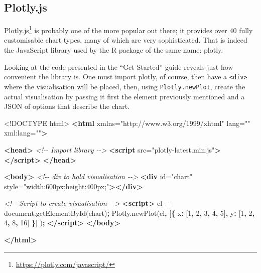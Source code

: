 \documentclass[
]{krantz}
\makeatletter
\newenvironment{Shaded}{\begin{snugshade}}{\end{snugshade}}
\newcommand{\AttributeTok}[1]{\textcolor[rgb]{0.61,0.61,0.61}{#1}}
\newcommand{\CommentTok}[1]{\textcolor[rgb]{0.37,0.37,0.37}{\textit{#1}}}
\newcommand{\DataTypeTok}[1]{\textcolor[rgb]{0.27,0.27,0.27}{#1}}
\newcommand{\DecValTok}[1]{\textcolor[rgb]{0.06,0.06,0.06}{#1}}
\newcommand{\KeywordTok}[1]{\textcolor[rgb]{0.27,0.27,0.27}{\textbf{#1}}}
\newcommand{\NormalTok}[1]{#1}
\newcommand{\OperatorTok}[1]{\textcolor[rgb]{0.43,0.43,0.43}{\textbf{#1}}}
\newcommand{\OtherTok}[1]{\textcolor[rgb]{0.37,0.37,0.37}{#1}}
\newcommand{\StringTok}[1]{\textcolor[rgb]{0.5,0.5,0.5}{#1}}
\newcommand{\VariableTok}[1]{\textcolor[rgb]{0,0,0}{#1}}
\renewcommand{\href}[2]{#2\footnote{\url{#1}}}
\newenvironment{kframe}{%
\medskip{}
\setlength{\fboxsep}{.8em}
 \def\at@end@of@kframe{}%
 \ifinner\ifhmode%
  \def\at@end@of@kframe{\end{minipage}}%
  \begin{minipage}{\columnwidth}%
 \fi\fi%
 \def\FrameCommand##1{\hskip\@totalleftmargin \hskip-\fboxsep
 \colorbox{shadecolor}{##1}\hskip-\fboxsep
     \hskip-\linewidth \hskip-\@totalleftmargin \hskip\columnwidth}%
 \MakeFramed {\advance\hsize-\width
   \@totalleftmargin\z@ \linewidth\hsize
   \@setminipage}}%
 {\par\unskip\endMakeFramed%
 \at@end@of@kframe}
\renewenvironment{Shaded}{\begin{kframe}}{\end{kframe}}
\makeatother
\begin{document}
\hypertarget{widgets-basics-candidates-plotly}{%
\subsection{Plotly.js}\label{widgets-basics-candidates-plotly}}

\href{https://plotly.com/javascript/}{Plotly.js} is probably one of the more popular out there; it provides over 40 fully customisable chart types, many of which are very sophisticated. That is indeed the JavaScript library used by the R package of the same name: plotly.

Looking at the code presented in the ``Get Started'' guide reveals just how convenient the library is. One must import plotly, of course, then have a \texttt{\textless{}div\textgreater{}} where the visualisation will be placed, then, using \texttt{Plotly.newPlot}, create the actual visualisation by passing it first the element previously mentioned and a JSON of options that describe the chart.

\begin{Shaded}
\begin{Highlighting}[]
\DataTypeTok{<!DOCTYPE }\NormalTok{html}\DataTypeTok{>}
\KeywordTok{<html}\OtherTok{ xmlns=}\StringTok{"http://www.w3.org/1999/xhtml"}\OtherTok{ lang=}\StringTok{""}\OtherTok{ xml:lang=}\StringTok{""}\KeywordTok{>}

\KeywordTok{<head>}
  \CommentTok{<!{-}{-} Import library {-}{-}>}
  \KeywordTok{<script}\OtherTok{ src=}\StringTok{"plotly{-}latest.min.js"}\KeywordTok{></script>}
\KeywordTok{</head>}

\KeywordTok{<body>}
  \CommentTok{<!{-}{-} div to hold visualisation {-}{-}>}
  \KeywordTok{<div}\OtherTok{ id=}\StringTok{"chart"}\OtherTok{ style=}\StringTok{"width:600px;height:400px;"}\KeywordTok{></div>}

  \CommentTok{<!{-}{-} Script to create visualisation {-}{-}>}
  \KeywordTok{<script>}
\NormalTok{    el }\OperatorTok{=} \VariableTok{document}\NormalTok{.}\AttributeTok{getElementById}\NormalTok{(}\StringTok{\textquotesingle{}chart\textquotesingle{}}\NormalTok{)}\OperatorTok{;}
    \VariableTok{Plotly}\NormalTok{.}\AttributeTok{newPlot}\NormalTok{(el}\OperatorTok{,}\NormalTok{ [}\OperatorTok{\{}
      \DataTypeTok{x}\OperatorTok{:}\NormalTok{ [}\DecValTok{1}\OperatorTok{,} \DecValTok{2}\OperatorTok{,} \DecValTok{3}\OperatorTok{,} \DecValTok{4}\OperatorTok{,} \DecValTok{5}\NormalTok{]}\OperatorTok{,}
      \DataTypeTok{y}\OperatorTok{:}\NormalTok{ [}\DecValTok{1}\OperatorTok{,} \DecValTok{2}\OperatorTok{,} \DecValTok{4}\OperatorTok{,} \DecValTok{8}\OperatorTok{,} \DecValTok{16}\NormalTok{] }\OperatorTok{\}}\NormalTok{]}
\NormalTok{    )}\OperatorTok{;}
  \KeywordTok{</script>}
\KeywordTok{</body>}

\KeywordTok{</html>}
\end{Highlighting}
\end{Shaded}
\end{document}
